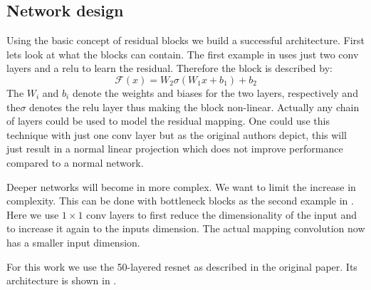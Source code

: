 \subsection{Network design}
\label{sec:concepts:resnet:design}
Using the basic concept of residual blocks we build a successful architecture. First lets look at what the blocks can contain. The first example in  uses just two \gls{conv} layers and a \gls{relu} to learn the residual. Therefore the block is described by:
\begin{equation}
    \mathcal{F}(x) = W_2\sigma(W_1 x + b_1) + b_2
\end{equation}
The $W_i$ and $b_i$ denote the weights and biases for the two layers, respectively and the$\sigma$ denotes the \gls{relu} layer thus making the block non-linear. Actually any chain of layers could be used to model the residual mapping. One could use this technique with just one \gls{conv} layer but as the original authors \citep{he_deep_2016} depict, this will just result in a normal linear projection which does not improve performance compared to a normal network.

Deeper networks will become in more complex. We want to limit the increase in complexity. This can be done with bottleneck blocks as the second example in . Here we use $1\times1$ \gls{conv} layers to first reduce the dimensionality of the input and to increase it again to the inputs dimension. The actual mapping convolution now has a smaller input dimension.

For this work we use the 50-layered \gls{resnet} as described in the original paper. Its architecture is shown in .
